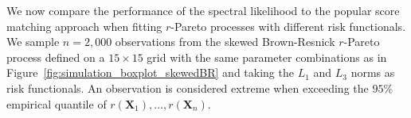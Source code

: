 \documentclass[12pt]{article}
\begin{document}
We now compare the performance of the spectral likelihood to the popular score matching approach \citep[see][]{deFondeville.Davison:2018} when fitting $r$-Pareto processes with different risk functionals.
%
We sample $n=2,000$ observations from the skewed Brown-Resnick $r$-Pareto process defined on a $15\times15$ grid with the same parameter combinations as in Figure~\ref{fig:simulation_boxplot_skewedBR} and taking the $L_1$ and $L_3$ norms as risk functionals. An observation is considered extreme when exceeding the 
$95\%$ empirical quantile of $r(\bm X_1),\dots,r(\bm X_n)$.
\end{document}
